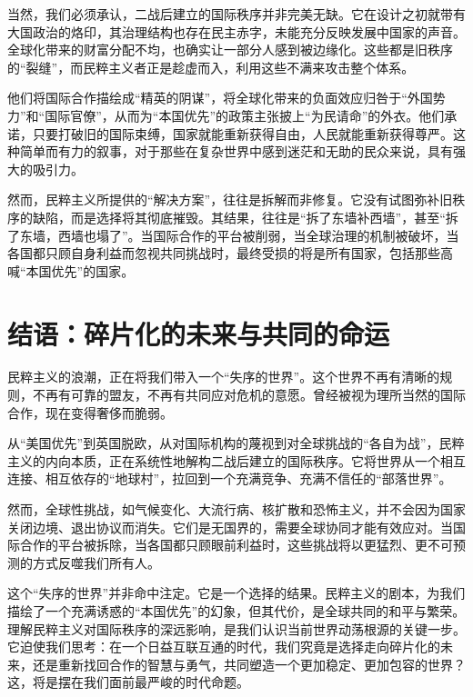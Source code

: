 当然，我们必须承认，二战后建立的国际秩序并非完美无缺。它在设计之初就带有大国政治的烙印，其治理结构也存在民主赤字，未能充分反映发展中国家的声音。全球化带来的财富分配不均，也确实让一部分人感到被边缘化。这些都是旧秩序的“裂缝”，而民粹主义者正是趁虚而入，利用这些不满来攻击整个体系。

他们将国际合作描绘成“精英的阴谋”，将全球化带来的负面效应归咎于“外国势力”和“国际官僚”，从而为“本国优先”的政策主张披上“为民请命”的外衣。他们承诺，只要打破旧的国际束缚，国家就能重新获得自由，人民就能重新获得尊严。这种简单而有力的叙事，对于那些在复杂世界中感到迷茫和无助的民众来说，具有强大的吸引力。

然而，民粹主义所提供的“解决方案”，往往是拆解而非修复。它没有试图弥补旧秩序的缺陷，而是选择将其彻底摧毁。其结果，往往是“拆了东墙补西墙”，甚至“拆了东墙，西墙也塌了”。当国际合作的平台被削弱，当全球治理的机制被破坏，当各国都只顾自身利益而忽视共同挑战时，最终受损的将是所有国家，包括那些高喊“本国优先”的国家。

\section{结语：碎片化的未来与共同的命运}

民粹主义的浪潮，正在将我们带入一个“失序的世界”。这个世界不再有清晰的规则，不再有可靠的盟友，不再有共同应对危机的意愿。曾经被视为理所当然的国际合作，现在变得奢侈而脆弱。

从“美国优先”到英国脱欧，从对国际机构的蔑视到对全球挑战的“各自为战”，民粹主义的内向本质，正在系统性地解构二战后建立的国际秩序。它将世界从一个相互连接、相互依存的“地球村”，拉回到一个充满竞争、充满不信任的“部落世界”。

然而，全球性挑战，如气候变化、大流行病、核扩散和恐怖主义，并不会因为国家关闭边境、退出协议而消失。它们是无国界的，需要全球协同才能有效应对。当国际合作的平台被拆除，当各国都只顾眼前利益时，这些挑战将以更猛烈、更不可预测的方式反噬我们所有人。

这个“失序的世界”并非命中注定。它是一个选择的结果。民粹主义的剧本，为我们描绘了一个充满诱惑的“本国优先”的幻象，但其代价，是全球共同的和平与繁荣。理解民粹主义对国际秩序的深远影响，是我们认识当前世界动荡根源的关键一步。它迫使我们思考：在一个日益互联互通的时代，我们究竟是选择走向碎片化的未来，还是重新找回合作的智慧与勇气，共同塑造一个更加稳定、更加包容的世界？这，将是摆在我们面前最严峻的时代命题。

